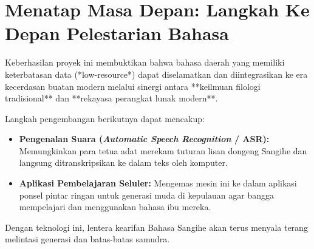 \section{Menatap Masa Depan: Langkah Ke Depan Pelestarian Bahasa}
Keberhasilan proyek ini membuktikan bahwa bahasa daerah yang memiliki keterbatasan data (*low-resource*) dapat diselamatkan dan diintegrasikan ke era kecerdasan buatan modern melalui sinergi antara **keilmuan filologi tradisional** dan **rekayasa perangkat lunak modern**.

Langkah pengembangan berikutnya dapat mencakup:
\begin{itemize}
    \item \textbf{Pengenalan Suara (\textit{Automatic Speech Recognition} / ASR):} Memungkinkan para tetua adat merekam tuturan lisan dongeng Sangihe dan langsung ditranskripsikan ke dalam teks oleh komputer.
    \item \textbf{Aplikasi Pembelajaran Seluler:} Mengemas mesin ini ke dalam aplikasi ponsel pintar ringan untuk generasi muda di kepulauan agar bangga mempelajari dan menggunakan bahasa ibu mereka.
\end{itemize}
Dengan teknologi ini, lentera kearifan Bahasa Sangihe akan terus menyala terang melintasi generasi dan batas-batas samudra.
